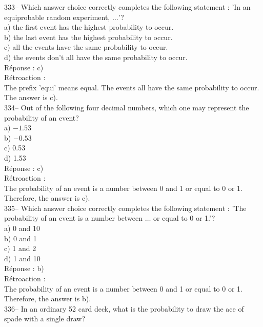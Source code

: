 \documentclass[letterpaper, 12pt]{article}
\begin{document}
333-- Which answer choice correctly completes the following statement : 'In an equiprobable random experiment,  $\ldots$'?\\

a) the first event has the highest probability to occur.\\
b) the last event has the highest probability to occur.\\
c) all the events have the same probability to occur.\\
d) the events don't all have the same probability to occur.\\

R\'eponse : c)\\

R\'etroaction : \\
The prefix 'equi' means equal. The events all have the same probability to occur. The answer is c).\\

334-- Out of the following four decimal numbers, which one may represent the probability of an event?\\

a) $-1.53$\\
b) $-0.53$\\
c) 0.53\\
d) 1.53\\

R\'eponse : c)\\

R\'etroaction : \\
The probability of an event is a number between 0 and 1 or
equal to 0 or 1. Therefore, the answer is c).\\

335-- Which answer choice correctly completes the following statement : 'The probability of an event is a number between $\ldots$  or equal to 0 or 1.'?\\

a) 0 and 10\\
b) 0 and 1\\
c) 1 and 2\\
d) 1 and 10\\

R\'eponse : b)\\

R\'etroaction : \\
The probability of an event is a number between 0 and 1 or equal to 0 or 1. Therefore, the answer is b).\\

336-- In an ordinary 52 card deck, what is the probability to draw the ace of spade with a single draw?\\
\end{document}
